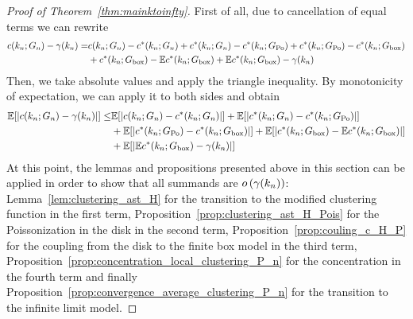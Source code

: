 \begin{proof}[Proof of Theorem~\ref{thm:mainktoinfty}]
First of all, due to cancellation of equal terms we can rewrite
\begin{align*}
    c(k_n;G_n)-\gamma(k_n) =& c(k_n;G_n)-c^\ast(k_n;G_n)+c^\ast(k_n;G_n)-c^\ast(k_n; G_{\text{Po}})+c^\ast(k_n; G_{\text{Po}})-c^\ast(k_n; G_{\text{box}}) \\
    &+c^\ast(k_n; G_{\text{box}})-\mathbb{E} c^\ast(k_n; G_{\text{box}})+\mathbb{E} c^\ast(k_n; G_{\text{box}})-\gamma(k_n)
\end{align*}
Then, we take absolute values and apply the triangle inequality. By monotonicity of expectation, we can apply it to both sides and obtain
\begin{align*}
    \mathbb{E}[|c(k_n;G_n)-\gamma(k_n)|] \leq & \mathbb{E}[|c(k_n;G_n)-c^\ast(k_n;G_n)|]+\mathbb{E}[|c^\ast(k_n;G_n)-c^\ast(k_n; G_{\text{Po}})|]\\&+\mathbb{E}[|c^\ast(k_n; G_{\text{Po}})-c^\ast(k_n; G_{\text{box}})|] 
    +\mathbb{E}[|c^\ast(k_n; G_{\text{box}})-\mathbb{E} c^\ast(k_n; G_{\text{box}})|]\\&+\mathbb{E}[|\mathbb{E} c^\ast(k_n; G_{\text{box}})-\gamma(k_n)|]
\end{align*}
At this point, the lemmas and propositions presented above in this section can be applied in order to show that all summands are $o\left(\gamma(k_n)\right)$: Lemma~\ref{lem:clustering_ast_H} for the transition to the modified clustering function in the first term, Proposition~\ref{prop:clustering_ast_H_Pois} for the Poissonization in the disk in the second term, Proposition~\ref{prop:couling_c_H_P} for the coupling from the disk to the finite box model in the third term, Proposition~\ref{prop:concentration_local_clustering_P_n} for the concentration in the fourth term and finally Proposition~\ref{prop:convergence_average_clustering_P_n} for the transition to the infinite limit model. 

\end{proof}
